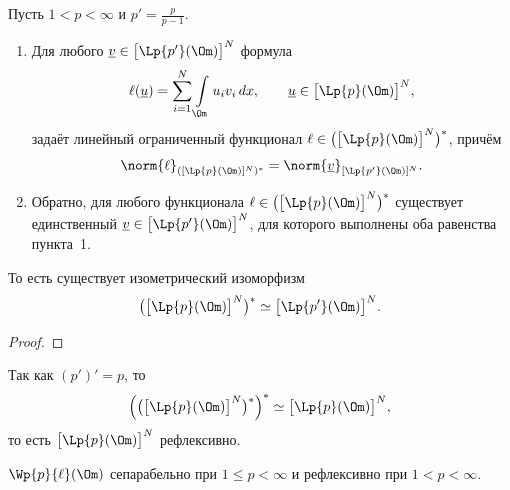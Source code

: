 \begin{proposition}\label{prop:dual}
Пусть $1 < p < \infty$ и $p' = \frac{p}{p-1}$.
\begin{enumerate}
  \item Для любого $\underline{v} \in \big[\Lp{p'}(\Om)\big]^N$ формула
        \[
          \ell(\underline{u}) = \sum_{i=1}^{N} \int\limits_\Om u_i v_i\, dx ,
          \qquad \underline{u} \in \big[\Lp{p}(\Om)\big]^N ,
        \]
        задаёт линейный ограниченный функционал
        $\ell \in \big(\big[\Lp{p}(\Om)\big]^N\big)^*$, причём
        \[
          \norm{\ell}_{([\Lp{p}(\Om)]^N)^*} = \norm{\underline{v}}_{[\Lp{p'}(\Om)]^N} .
        \]
  \item Обратно, для любого функционала
        $\ell \in \big(\big[\Lp{p}(\Om)\big]^N\big)^*$ существует единственный
        $\underline{v} \in \big[\Lp{p'}(\Om)\big]^N$, для которого выполнены оба
        равенства пункта~1.
\end{enumerate}
То есть существует изометрический изоморфизм
\[
  \big(\big[\Lp{p}(\Om)\big]^N\big)^* \simeq \big[\Lp{p'}(\Om)\big]^N .
\]
\end{proposition}

\begin{proof}
\plusplus
\end{proof}

\begin{corollary}
Так как $(p')' = p$, то
\[
  \Big(\big(\big[\Lp{p}(\Om)\big]^N\big)^*\Big)^* \simeq \big[\Lp{p}(\Om)\big]^N ,
\]
то есть $\big[\Lp{p}(\Om)\big]^N$ рефлексивно.
\end{corollary}

\begin{theorem}[Т2]\label{thm:w-sep-refl}
$\Wp{p}{\ell}(\Om)$ сепарабельно при $1 \le p < \infty$ и рефлексивно при $1 < p < \infty$.
\end{theorem}

